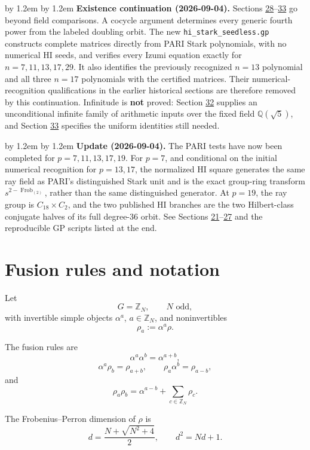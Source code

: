 \documentclass[11pt,reqno]{amsart}
\theoremstyle{plain}
\newenvironment{revnote}%
  {\par\addvspace{0.7\baselineskip}\begingroup\small
   \advance\leftskip by 1.2em \advance\rightskip by 1.2em \noindent\ignorespaces}%
  {\par\endgroup\addvspace{0.7\baselineskip}}
\begin{document}
\begin{revnote}
\textbf{Existence continuation (2026-09-04).} Sections \hyperref[sec:28]{28}--\hyperref[sec:33]{33} go beyond field comparisons. A cocycle argument determines every generic fourth power from the labeled doubling orbit. The new \texttt{hi\_\allowbreak stark\_\allowbreak seedless.gp} constructs complete matrices directly from PARI Stark polynomials, with no numerical HI seeds, and verifies every Izumi equation exactly for \(n=7,11,13,17,29\). It also identifies the previously recognized \(n=13\) polynomial and all three \(n=17\) polynomials with the certified matrices. Their numerical-recognition qualifications in the earlier historical sections are therefore removed by this continuation. Infinitude is \textbf{not} proved: Section \hyperref[sec:32]{32} supplies an unconditional infinite family of arithmetic inputs over the fixed field \(\mathbb Q(\sqrt5)\), and Section \hyperref[sec:33]{33} specifies the uniform identities still needed.
\end{revnote}

\begin{revnote}
\textbf{Update (2026-09-04).} The PARI tests have now been completed for \(p=7,11,13,17,19\). For \(p=7\), and conditional on the initial numerical recognition for \(p=13,17\), the normalized HI square generates the same ray field as PARI's distinguished Stark unit and is the exact group-ring transform \(s^{2-\operatorname{Frob}_{(2)}}\), rather than the same distinguished generator. At \(p=19\), the ray group is \(C_{18}\times C_2\), and the two published HI branches are the two Hilbert-class conjugate halves of its full degree-36 orbit. See Sections \hyperref[sec:21]{21}--\hyperref[sec:27]{27} and the reproducible GP scripts listed at the end.
\end{revnote}

\section{Fusion rules and notation}\label{sec:1}

Let
\[
G=\mathbb Z_N,\qquad N\text{ odd},
\]
with invertible simple objects \(\alpha^a\), \(a\in\mathbb Z_N\), and noninvertibles
\[
\rho_a:=\alpha^a\rho.
\]

The fusion rules are
\[
\alpha^a\alpha^b=\alpha^{a+b},
\]
\[
\alpha^a\rho_b=\rho_{a+b},
\qquad
\rho_a\alpha^b=\rho_{a-b},
\]
and
\[
\rho_a\rho_b=\alpha^{a-b}+\sum_{c\in\mathbb Z_N}\rho_c.
\]

The Frobenius--Perron dimension of \(\rho\) is
\[
d=\frac{N+\sqrt{N^2+4}}2,
\qquad
d^2=Nd+1.
\]
\end{document}

